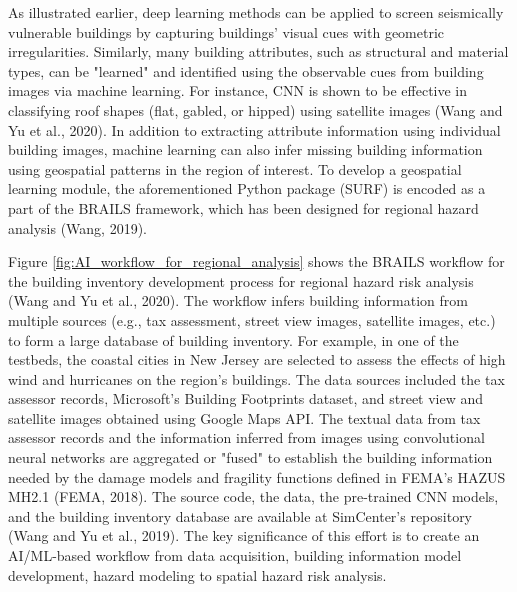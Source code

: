As illustrated earlier, deep learning methods can be applied to screen seismically vulnerable buildings by capturing buildings' visual cues with geometric irregularities\citep{yu2020}. Similarly, many building attributes, such as structural and material types, can be "learned" and identified using the observable cues from building images via machine learning. For instance, CNN is shown to be effective in classifying roof shapes (flat, gabled, or hipped) using satellite images (Wang and Yu et al., 2020). In addition to extracting attribute information using individual building images, machine learning can also infer missing building information using geospatial patterns in the region of interest. To develop a geospatial learning module, the aforementioned Python package (SURF) is encoded as a part of the BRAILS framework, which has been designed for regional hazard analysis (Wang, 2019). 

Figure \ref{fig:AI_workflow_for_regional_analysis} shows the BRAILS workflow for the building inventory development process for regional hazard risk analysis (Wang and Yu et al., 2020). The workflow infers building information from multiple sources (e.g., tax assessment, street view images, satellite images, etc.) to form a large database of building inventory. For example, in one of the testbeds, the coastal cities in New Jersey are selected to assess the effects of high wind and hurricanes on the region's buildings. The data sources included the tax assessor records, Microsoft's Building Footprints dataset, and street view and satellite images obtained using Google Maps API. The textual data from tax assessor records and the information inferred from images using convolutional neural networks are aggregated or "fused" to establish the building information needed by the damage models and fragility functions defined in FEMA's HAZUS MH2.1 (FEMA, 2018). The source code, the data, the pre-trained CNN models, and the building inventory database are available at SimCenter's repository (Wang and Yu et al., 2019). The key significance of this effort is to create an AI/ML-based workflow from data acquisition, building information model development, hazard modeling to spatial hazard risk analysis. 

